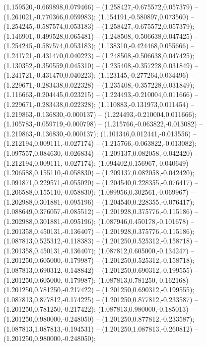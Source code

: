  (1.159520,-0.669898,0.079466) -- (1.258427,-0.675572,0.057379) -- (1.261021,-0.770366,0.059983);
 (1.154191,-0.580897,0.073560) -- (1.254245,-0.587574,0.053183) -- (1.258427,-0.675572,0.057379);
 (1.146901,-0.499528,0.065481) -- (1.248508,-0.506638,0.047425) -- (1.254245,-0.587574,0.053183);
 (1.138310,-0.424468,0.055666) -- (1.241721,-0.431470,0.040223) -- (1.248508,-0.506638,0.047425);
 (1.130352,-0.350559,0.045310) -- (1.235408,-0.357228,0.031849) -- (1.241721,-0.431470,0.040223);
 (1.123145,-0.277264,0.034496) -- (1.229671,-0.283438,0.022328) -- (1.235408,-0.357228,0.031849);
 (1.116663,-0.204445,0.023215) -- (1.224493,-0.210004,0.011666) -- (1.229671,-0.283438,0.022328);
 (1.110883,-0.131973,0.011454) -- (1.219863,-0.136830,-0.000137) -- (1.224493,-0.210004,0.011666);
 (1.105783,-0.059719,-0.000798) -- (1.215766,-0.063822,-0.013082) -- (1.219863,-0.136830,-0.000137);
 (1.101346,0.012441,-0.013556) -- (1.212194,0.009111,-0.027174) -- (1.215766,-0.063822,-0.013082);
 (1.097557,0.084630,-0.026834) -- (1.209137,0.082058,-0.042420) -- (1.212194,0.009111,-0.027174);
 (1.094402,0.156967,-0.040649) -- (1.206588,0.155110,-0.058830) -- (1.209137,0.082058,-0.042420);
 (1.091871,0.229571,-0.055020) -- (1.204540,0.228355,-0.076417) -- (1.206588,0.155110,-0.058830);
 (1.089956,0.302561,-0.069967) -- (1.202988,0.301881,-0.095196) -- (1.204540,0.228355,-0.076417);
 (1.088649,0.376057,-0.085512) -- (1.201928,0.375776,-0.115186) -- (1.202988,0.301881,-0.095196);
 (1.087946,0.450178,-0.101678) -- (1.201358,0.450131,-0.136407) -- (1.201928,0.375776,-0.115186);
 (1.087813,0.525312,-0.118383) -- (1.201250,0.525312,-0.158718) -- (1.201358,0.450131,-0.136407);
 (1.087812,0.605000,-0.134247) -- (1.201250,0.605000,-0.179987) -- (1.201250,0.525312,-0.158718);
 (1.087813,0.690312,-0.148842) -- (1.201250,0.690312,-0.199555) -- (1.201250,0.605000,-0.179987);
 (1.087813,0.781250,-0.162168) -- (1.201250,0.781250,-0.217422) -- (1.201250,0.690312,-0.199555);
 (1.087813,0.877812,-0.174225) -- (1.201250,0.877812,-0.233587) -- (1.201250,0.781250,-0.217422);
 (1.087813,0.980000,-0.185013) -- (1.201250,0.980000,-0.248050) -- (1.201250,0.877812,-0.233587);
 (1.087813,1.087813,-0.194531) -- (1.201250,1.087813,-0.260812) -- (1.201250,0.980000,-0.248050);
